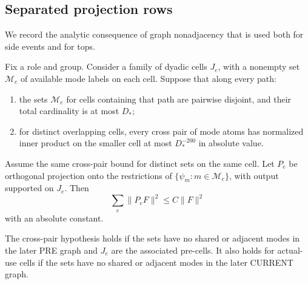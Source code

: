 \subsection{Separated projection rows}

We record the analytic consequence of graph nonadjacency that is
used both for side events and for tops.

\begin{lemma}
\label{lem:separated-mode-rows}
Fix a role and group.  Consider a family of dyadic cells \(J_e\),
with a nonempty set \(\mathcal M_e\) of available mode labels on
each cell.  Suppose that along every path:
\begin{enumerate}
 \item the sets \(\mathcal M_e\) for cells containing that path are
 pairwise disjoint, and their total cardinality is at most \(D_*\);
 \item for distinct overlapping cells, every cross pair of mode
 atoms has normalized inner product on the smaller cell at most
 \(D_*^{-200}\) in absolute value.
\end{enumerate}
Assume the same cross-pair bound for distinct sets on the same cell.
Let \(P_e\) be orthogonal projection onto the restrictions of
\(\{\psi_m:m\in\mathcal M_e\}\), with output supported on \(J_e\).
Then
\[
 \sum_e\|P_eF\|^2\le C\|F\|^2
\]
with an absolute constant.

The cross-pair hypothesis holds if the sets have no shared or
adjacent modes in the later PRE graph and \(J_e\) are the associated
pre-cells.  It also holds for actual-use cells if the sets have no
shared or adjacent modes in the later CURRENT graph.
\end{lemma}

